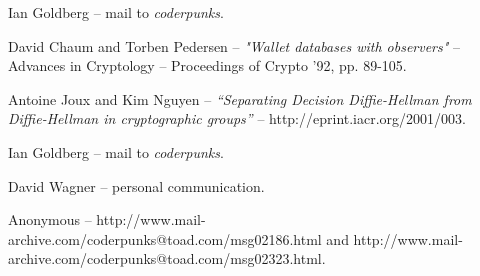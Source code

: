 \documentclass[a4paper,titlepage]{article}
\begin{document}
\begin{thebibliography}{99}

	 Ian Goldberg -- mail to {\sl coderpunks}.

	 David Chaum and Torben Pedersen -- {\sl
	"Wallet databases with observers"} -- Advances in Cryptology
	-- Proceedings of Crypto '92, pp. 89-105.

	 Antoine Joux and Kim Nguyen -- {\sl
	``Separating Decision Diffie-Hellman from Diffie-Hellman in
	cryptographic groups''} -- http://eprint.iacr.org/2001/003.

	 Ian Goldberg -- mail to {\sl coderpunks}.

	 David Wagner -- personal communication.

	 Anonymous --
	http://www.mail-archive.com/coderpunks@toad.com/msg02186.html
	and
	http://www.mail-archive.com/coderpunks@toad.com/msg02323.html.

\end{thebibliography}
\end{document}
